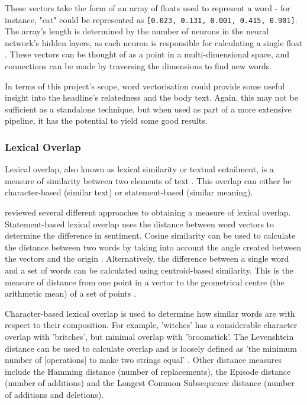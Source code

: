 These vectors take the form of an array of floats used to represent a word - for instance, "cat" could be represented as \texttt{[0.023, 0.131, 0.001, 0.415, 0.901]}. The array's length is determined by the number of neurons in the neural network's hidden layers, as each neuron is responsible for calculating a single float \cite{bommana2019}. These vectors can be thought of as a point in a multi-dimensional space, and connections can be made by traversing the dimensions to find new words.

In terms of this project's scope, word vectorisation could provide some useful insight into the headline's relatedness and the body text. Again, this may not be sufficient as a standalone technique, but when used as part of a more extensive pipeline, it has the potential to yield some good results.

\subsubsection{Lexical Overlap}
Lexical overlap, also known as lexical similarity or textual entailment, is a measure of similarity between two elements of text \cite{adams2006}. This overlap can either be character-based (similar text) or statement-based (similar meaning).

 reviewed several different approaches to obtaining a measure of lexical overlap. Statement-based lexical overlap uses the distance between word vectors to determine the difference in sentiment. Cosine similarity can be used to calculate the distance between two words by taking into account the angle created between the vectors and the origin \cite{qian2004}. Alternatively, the difference between a single word and a set of words can be calculated using centroid-based similarity. This is the measure of distance from one point in a vector to the geometrical centre (the arithmetic mean) of a set of points \cite{Awrejcewicz2012}.  

Character-based lexical overlap is used to determine how similar words are with respect to their composition. For example, 'witches' has a considerable character overlap with 'britches', but minimal overlap with 'broomstick'. The Levenshtein distance can be used to calculate overlap and is loosely defined as 'the minimum number of [operations] to make two strings equal' \cite{navarro2001guided}. Other distance measures include the Hamming distance (number of replacements), the Episode distance (number of additions) and the Longest Common Subsequence distance (number of additions and deletions). 



